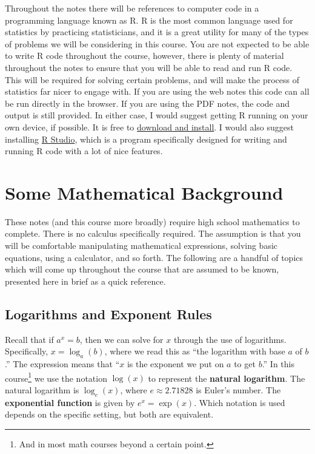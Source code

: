\documentclass[
  letterpaper,
  DIV=11,
  numbers=noendperiod]{scrreprt}
\theoremstyle{definition}
\theoremstyle{definition}
\theoremstyle{definition}
\theoremstyle{remark}
\begin{document}
Throughout the notes there will be references to computer code in a
programming language known as R. R is the most common language used for
statistics by practicing statisticians, and it is a great utility for
many of the types of problems we will be considering in this course. You
are not expected to be able to write R code throughout the course,
however, there is plenty of material throughout the notes to ensure that
you will be able to read and run R code. This will be required for
solving certain problems, and will make the process of statistics far
nicer to engage with. If you are using the web notes this code can all
be run directly in the browser. If you are using the PDF notes, the code
and output is still provided. In either case, I would suggest getting R
running on your own device, if possible. It is free to
\href{https://cran.rstudio.com/}{download and install}. I would also
suggest installing \href{https://posit.co/download/rstudio-desktop/}{R
Studio}, which is a program specifically designed for writing and
running R code with a lot of nice features.

\section*{Some Mathematical
Background}\label{some-mathematical-background}


These notes (and this course more broadly) require high school
mathematics to complete. There is no calculus specifically required. The
assumption is that you will be comfortable manipulating mathematical
expressions, solving basic equations, using a calculator, and so forth.
The following are a handful of topics which will come up throughout the
course that are assumed to be known, presented here in brief as a quick
reference.

\subsection*{Logarithms and Exponent
Rules}\label{logarithms-and-exponent-rules}

Recall that if \(a^x = b\), then we can solve for \(x\) through the use
of logarithms. Specifically, \(x = \log_a(b)\), where we read this as
``the logarithm with base \(a\) of \(b\).'' The expression means that
``\(x\) is the exponent we put on \(a\) to get \(b\).'' In this
course\footnote{And in most math courses beyond a certain point.} we use
the notation \(\log(x)\) to represent the \textbf{natural logarithm}.
The natural logarithm is \(\log_e(x)\), where \(e \approx  2.71828\) is
Euler's number. The \textbf{exponential function} is given by
\(e^{x} = \exp(x)\). Which notation is used depends on the specific
setting, but both are equivalent.
\end{document}
